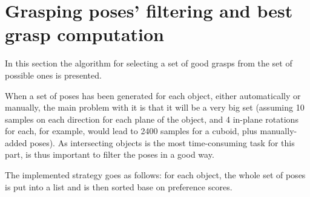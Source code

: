 \section{Grasping poses' filtering and best grasp computation}
In this section the algorithm for selecting a set of good grasps from the set of
possible ones is presented.

When a set of poses has been generated for each object, either automatically or
manually, the main problem with it is that it will be a very big set (assuming
10 samples on each direction for each plane of the object, and 4 in-plane
rotations for each, for example, would
lead to 2400 samples for a cuboid, plus manually-added poses). As intersecting
objects is the most time-consuming task for this part, is thus
important to filter the poses in a good way.

The implemented strategy goes as follows: for each object, the whole set of
poses is put into a list and is then sorted base on preference scores.

